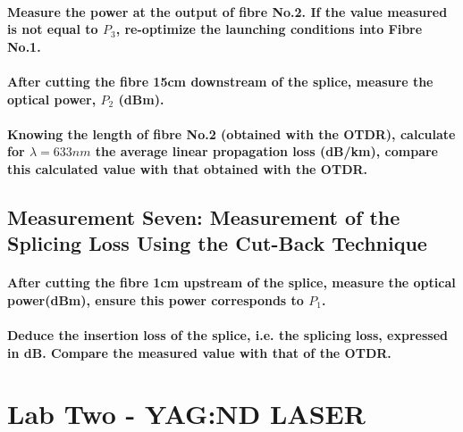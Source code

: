 \documentclass[colorlinks,11pt,a4paper,normalphoto,withhyper,ragged2e]{altareport}
\begin{document}
\paragraph{Measure the power at the output of fibre No.2. If the value measured is not equal to $P_3$, re-optimize the launching conditions into Fibre No.1.}

\paragraph{After cutting the fibre 15cm downstream of the splice, measure the optical power, $P_2$ (dBm).}

\paragraph{Knowing the length of fibre No.2 (obtained with the OTDR), calculate for $\lambda=633nm$ the average linear propagation loss (dB/km), compare this calculated value with that obtained with the OTDR.}




\subsection{Measurement Seven: Measurement of the Splicing Loss Using the Cut-Back Technique}

\paragraph{After cutting the fibre 1cm upstream of the splice, measure the optical power(dBm), ensure this power corresponds to $P_1$.}

\paragraph{Deduce the insertion loss of the splice, i.e. the splicing loss, expressed in dB. Compare the measured value with that of the OTDR.}




\section{Lab Two - YAG:ND LASER}









\newpage
{}  %


\end{document}
